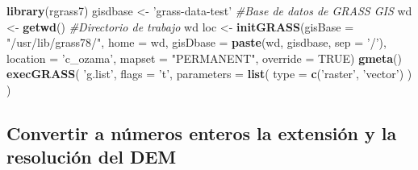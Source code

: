 \documentclass[11pt,]{article}
\newenvironment{Shaded}{\begin{snugshade}}{\end{snugshade}}
\newcommand{\KeywordTok}[1]{\textcolor[rgb]{0.13,0.29,0.53}{\textbf{#1}}}
\newcommand{\DataTypeTok}[1]{\textcolor[rgb]{0.13,0.29,0.53}{#1}}
\newcommand{\StringTok}[1]{\textcolor[rgb]{0.31,0.60,0.02}{#1}}
\newcommand{\CommentTok}[1]{\textcolor[rgb]{0.56,0.35,0.01}{\textit{#1}}}
\newcommand{\OtherTok}[1]{\textcolor[rgb]{0.56,0.35,0.01}{#1}}
\newcommand{\OperatorTok}[1]{\textcolor[rgb]{0.81,0.36,0.00}{\textbf{#1}}}
\newcommand{\NormalTok}[1]{#1}
\begin{document}
\begin{Shaded}
\end{Shaded}

\begin{Shaded}
\begin{Highlighting}[]
\KeywordTok{library}\NormalTok{(rgrass7)}
\NormalTok{gisdbase <-}\StringTok{ 'grass-data-test'} \CommentTok{#Base de datos de GRASS GIS}
\NormalTok{wd <-}\StringTok{ }\KeywordTok{getwd}\NormalTok{() }\CommentTok{#Directorio de trabajo}
\NormalTok{wd}
\NormalTok{loc <-}\StringTok{ }\KeywordTok{initGRASS}\NormalTok{(}\DataTypeTok{gisBase =} \StringTok{"/usr/lib/grass78/"}\NormalTok{,}
                 \DataTypeTok{home =}\NormalTok{ wd,}
                 \DataTypeTok{gisDbase =} \KeywordTok{paste}\NormalTok{(wd, gisdbase, }\DataTypeTok{sep =} \StringTok{'/'}\NormalTok{),}
                 \DataTypeTok{location =} \StringTok{'c_ozama'}\NormalTok{,}
                 \DataTypeTok{mapset =} \StringTok{"PERMANENT"}\NormalTok{,}
                 \DataTypeTok{override =} \OtherTok{TRUE}\NormalTok{)}
\KeywordTok{gmeta}\NormalTok{()}
\KeywordTok{execGRASS}\NormalTok{(}
  \StringTok{'g.list'}\NormalTok{,}
  \DataTypeTok{flags =} \StringTok{'t'}\NormalTok{,}
  \DataTypeTok{parameters =} \KeywordTok{list}\NormalTok{(}
    \DataTypeTok{type =} \KeywordTok{c}\NormalTok{(}\StringTok{'raster'}\NormalTok{, }\StringTok{'vector'}\NormalTok{)}
\NormalTok{  )}
\NormalTok{)}
\end{Highlighting}
\end{Shaded}

\subsection{Convertir a números enteros la extensión y la resolución del
DEM}\label{convertir-a-nuxfameros-enteros-la-extensiuxf3n-y-la-resoluciuxf3n-del-dem}
\end{document}
